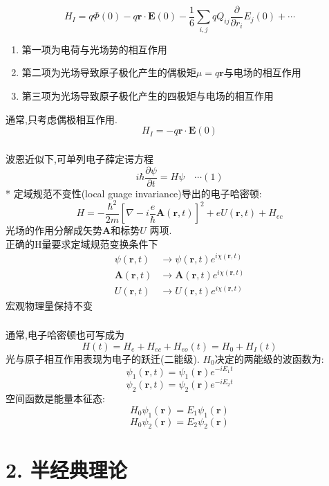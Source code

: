 \begin{frame} 
\frametitle{}
    \[ H_I = q\Phi(0) - q\mathbf{r}\cdot \mathbf{E}(0) - \frac{1}{6} \sum_{i,j} qQ_{ij}\frac{\partial }{\partial r_i }E_j(0) + \cdots \]
    \begin{enumerate}
        \item 第一项为电荷与光场势的相互作用
        \item 第二项为光场导致原子极化产生的偶极矩$\mu=q\mathbf{r}$与电场的相互作用
        \item 第三项为光场导致原子极化产生的四极矩与电场的相互作用
    \end{enumerate}
    通常,只考虑偶极相互作用. 
    \[ H_I = - q\mathbf{r}\cdot \mathbf{E}(0)\]
\end{frame}

\begin{frame} 
    \frametitle{}
    {\Bullet} 波恩近似下,可单列电子薛定谔方程
    \[ i \hbar \frac{\partial \psi}{\partial t} = H \psi \quad \cdots  (1)\]
    * 定域规范不变性(local guage invariance)导出的电子哈密顿:
    \[ H=-\frac{\hbar^{2}}{2 m}\left[\nabla-i \frac{e}{\hbar} \mathbf{A}(\mathbf{r}, t)\right]^{2}+e U(\mathbf{r}, t)+ H_{ec}\]
    光场的作用分解成矢势$\mathbf{A}$和标势$U$ 两项.  \\
    正确的H量要求定域规范变换条件下
    \[ \begin{aligned}
        \psi( \mathbf{r},t) & \to \psi( \mathbf{r},t)  e^ {i \chi(\mathbf{r}, t)}\\
        \mathbf{A}(\mathbf{r}, t)  & \to \mathbf{A}(\mathbf{r}, t)e^ {i \chi(\mathbf{r}, t)} \\
        U(\mathbf{r}, t) & \to U(\mathbf{r}, t) e^ {i \chi(\mathbf{r}, t)} 
    \end{aligned}\] 
    宏观物理量保持不变
\end{frame}

\begin{frame} 
\frametitle{}
    通常,电子哈密顿也可写成为
    \[ H(t)= H_e + H_{ec} + H_{eo}(t) = H_0 + H_I(t)\]
    光与原子相互作用表现为电子的跃迁(二能级). $H_0$决定的两能级的波函数为:
       \[ \psi_1(\mathbf{r},t)= \psi_1(\mathbf{r})e ^{-i E_1 t} \]
       \[ \psi_2(\mathbf{r},t)= \psi_2(\mathbf{r})e ^{-i E_2 t} \]
    空间函数是能量本征态:
       \[ H_0\psi_1(\mathbf{r})= E_1 \psi_1(\mathbf{r}) \]
       \[ H_0\psi_2(\mathbf{r})= E_2 \psi_2(\mathbf{r}) \]

\end{frame}

\section{2. 半经典理论}

